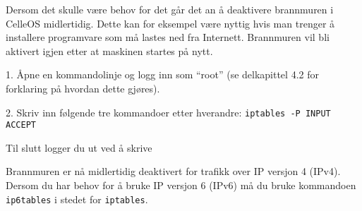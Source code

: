 Dersom det skulle v\ae re behov for det g\aa r det an \aa{} deaktivere brannmuren i CelleOS midlertidig. Dette kan for eksempel v\ae re nyttig hvis man trenger \aa{} installere programvare som m\aa{} lastes ned fra Internett. Brannmuren vil bli aktivert igjen etter at maskinen startes p\aa{} nytt. 
\item{1.} \AA pne en kommandolinje og logg inn som ``root'' (se delkapittel 4.2 for forklaring p\aa{} hvordan dette gj\o res).
\item{2.} Skriv inn f\o lgende tre kommandoer etter hverandre:
\medskip
{\tt iptables -P INPUT ACCEPT}\break
{}\break
{}
\medskip
\item{} Til slutt logger du ut ved \aa{} skrive
\medskip
{}
\medskip
\item{} Brannmuren er n\aa{} midlertidig deaktivert for trafikk over IP versjon 4 (IPv4). Dersom du har behov for \aa{} bruke IP versjon 6 (IPv6) m\aa{} du bruke kommandoen {\tt ip6tables} i stedet for {\tt iptables}.
\vfill\eject\bye
